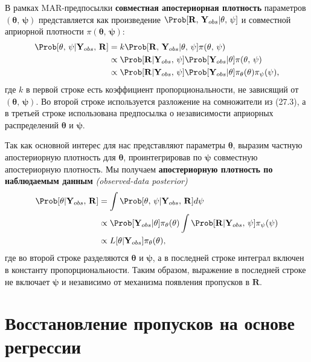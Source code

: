 В рамках MAR-предпосылки {\bf совместная апостериорная плотность}  параметров $(\mathbf{\theta}, \, \mathbf{\psi})$ представляется как произведение $\Prob[\mathbf{R}, \, \mathbf{Y}_{obs}|\mathbf{\theta}, \, \mathbf{\psi}]$ и совместной априорной плотности $\pi (\mathbf{\theta}, \, \mathbf{\psi})$:
\begin{align}
\Prob[\mathbf{\theta}, \, \mathbf{\psi}|\mathbf{Y}_{obs}, \, \mathbf{R}] &= k \Prob[\mathbf{R}, \, \mathbf{Y}_{obs}|\mathbf{\theta}, \, \mathbf{\psi}] \pi (\mathbf{\theta}, \, \mathbf{\psi}) \\
&\propto \Prob[\mathbf{R}|\mathbf{Y}_{obs}, \, \mathbf{\psi}] \Prob[\mathbf{Y}_{obs}|\mathbf{\theta}]\pi (\mathbf{\theta}, \, \mathbf{\psi}) \notag \\
&\propto \Prob[\mathbf{R}|\mathbf{Y}_{obs}, \, \mathbf{\psi}] \Prob[\mathbf{Y}_{obs}|\mathbf{\theta}]\pi_{\theta} (\mathbf{\theta})\pi_{\psi} (\mathbf{\psi}), \notag
\end{align}
где $k$ в первой строке есть коэффициент пропорциональности, не зависящий от $(\mathbf{\theta}, \, \mathbf{\psi})$. Во второй строке используется разложение на сомножители из (27.3), а в третьей строке использована предпосылка о независимости априорных распределений $\mathbf{\theta}$ и $\mathbf{\psi}$.

Так как основной интерес для нас представляют параметры $\mathbf{\theta}$, выразим частную апостериорную плотность для $\mathbf{\theta}$, проинтегрировав по $\mathbf{\psi}$  совместную апостериорную плотность. Мы получаем {\bf апостериорную плотность по наблюдаемым данным} \emph{(observed-data posterior)}
\begin{align}
\Prob[\mathbf{\theta}|\mathbf{Y}_{obs}, \, \mathbf{R}] &= \int \Prob[\mathbf{\theta}, \, \mathbf{\psi}|\mathbf{Y}_{obs}, \, \mathbf{R}]d\mathbf{\psi} \\
&\propto \Prob[\mathbf{Y}_{obs}|\mathbf{\theta}]\pi_{\theta} (\mathbf{\theta}) \int \Prob[\mathbf{R}|\mathbf{Y}_{obs}, \, \mathbf{\psi}]\pi_{\psi} (\mathbf{\psi}) \notag \\
&\propto L [\mathbf{\theta}|\mathbf{Y}_{obs}]\pi_{\theta} (\mathbf{\theta}), \notag 
\end{align}
где во второй строке разделяются $\mathbf{\theta}$ и $\mathbf{\psi}$, а в последней строке интеграл включен в константу пропорциональности. Таким образом, выражение в последней строке не включает $\mathbf{\psi}$ и независимо от механизма появления пропусков в $\mathbf{R}$.

\section{Восстановление пропусков на основе регрессии} 

